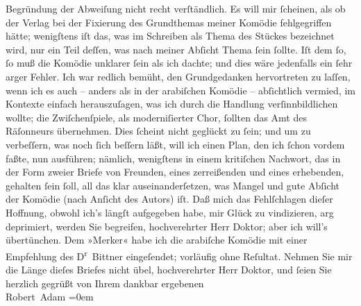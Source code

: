 \begin{ledgroupsized}[t]{13cm}
               Begründung der Abweiſung nicht recht verſtändlich. Es will mir ſcheinen, als ob der
               Verlag bei der Fixierung des Grundthemas meiner Komödie fehlgegriffen hätte;
               wenigſtens iſt das, was im Schreiben als Thema des Stückes bezeichnet wird, nur ein
               Teil deſſen, was nach meiner Abſicht Thema ſein ſollte. Iſt dem ſo, ſo muß die
               Komödie unklarer ſein als ich dachte; und dies wäre jedenfalls ein ſehr arger Fehler.
               Ich war redlich bemüht, den Grundgedanken hervortreten zu laſſen, {\pb}wenn ich es auch – anders als in der arabiſchen Komödie – abſichtlich vermied,
               im Kontexte einfach herauszuſagen, was ich durch die Handlung verſinnbildlichen
               wollte; die Zwiſchenſpiele, als moderniſierter Chor, ſollten das Amt des Räſonneurs
               übernehmen.\pend
           \pstart
           Dies ſcheint nicht geglückt zu ſein; und um zu verbeſſern, was noch ſich beſſern
               läßt, will ich einen Plan, den ich ſchon vordem faßte, nun ausführen; nämlich,
               wenigſtens in einem kritiſchen Nachwort, das in der Form zweier Briefe von Freunden,
               eines zerreißenden und eines erhebenden, {\pb}gehalten
               ſein ſoll, all das klar auseinanderſetzen, was Mangel und gute Abſicht der Komödie
               (nach Anſicht des Autors) iſt.\pend
           \pstart
           Daß mich das Fehlſchlagen dieſer Hoffnung, obwohl ich’s längſt aufgegeben habe, mir
               Glück zu vindizieren, arg deprimiert, werden Sie begreifen, hochverehrter Herr
               Doktor; aber ich will’s übertünchen.\pend
           \pstart
           Dem »Merker« habe ich die arabiſche Komödie mit einer Empfehlung des D\textsuperscript{r} Bittner
               eingeſendet; vorläufig ohne Reſultat.\pend
           \pstart
           Nehmen Sie mir die Länge dieſes Briefes nicht übel, hochverehrter Herr Doktor, und
               ſeien Sie herzlich gegrüßt von Ihrem\pend
           \pstart
           dankbar ergebenen{\\[\baselineskip]}\spacefill\mbox{Robert Adam}\pend
           \leftskip=0em{}
         
         \endnumbering{}\end{ledgroupsized}  \newcommand{\dateiname}{L02002}\newcommand{\titel}{Robert Adam an Arthur Schnitzler, 3. 2. 1911}\newcommand{\editorInnen}{Martin Anton Müller und Gerd-Hermann Susen}
      